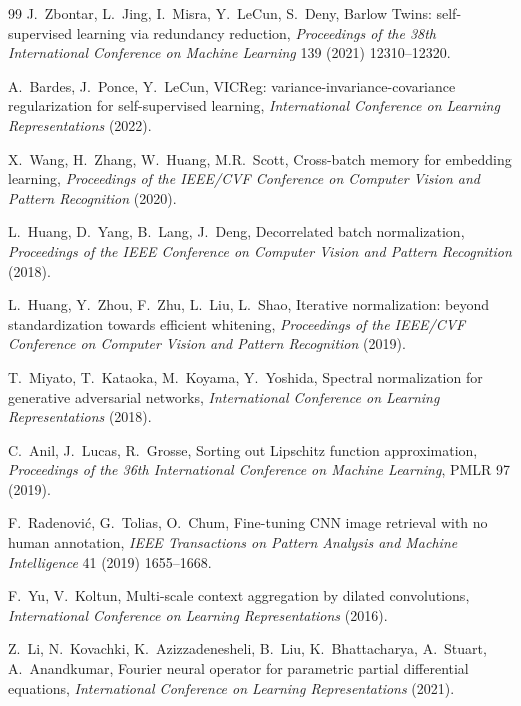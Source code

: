 \documentclass[preprint,11pt,a4paper]{elsarticle}
\begin{document}
\begin{thebibliography}{99}
J.~Zbontar, L.~Jing, I.~Misra, Y.~LeCun, S.~Deny,
\newblock Barlow Twins: self-supervised learning via redundancy reduction,
\newblock \emph{Proceedings of the 38th International Conference on Machine Learning}
139 (2021) 12310--12320.

A.~Bardes, J.~Ponce, Y.~LeCun,
\newblock VICReg: variance-invariance-covariance regularization for
self-supervised learning,
\newblock \emph{International Conference on Learning Representations} (2022).

X.~Wang, H.~Zhang, W.~Huang, M.R.~Scott,
\newblock Cross-batch memory for embedding learning,
\newblock \emph{Proceedings of the IEEE/CVF Conference on Computer Vision and Pattern
Recognition} (2020).

L.~Huang, D.~Yang, B.~Lang, J.~Deng,
\newblock Decorrelated batch normalization,
\newblock \emph{Proceedings of the IEEE Conference on Computer Vision and Pattern
Recognition} (2018).

L.~Huang, Y.~Zhou, F.~Zhu, L.~Liu, L.~Shao,
\newblock Iterative normalization: beyond standardization towards efficient whitening,
\newblock \emph{Proceedings of the IEEE/CVF Conference on Computer Vision and Pattern
Recognition} (2019).

T.~Miyato, T.~Kataoka, M.~Koyama, Y.~Yoshida,
\newblock Spectral normalization for generative adversarial networks,
\newblock \emph{International Conference on Learning Representations} (2018).

C.~Anil, J.~Lucas, R.~Grosse,
\newblock Sorting out Lipschitz function approximation,
\newblock \emph{Proceedings of the 36th International Conference on Machine Learning},
PMLR 97 (2019).

F.~Radenovi\'c, G.~Tolias, O.~Chum,
\newblock Fine-tuning CNN image retrieval with no human annotation,
\newblock \emph{IEEE Transactions on Pattern Analysis and Machine Intelligence}
41 (2019) 1655--1668.

F.~Yu, V.~Koltun,
\newblock Multi-scale context aggregation by dilated convolutions,
\newblock \emph{International Conference on Learning Representations} (2016).

Z.~Li, N.~Kovachki, K.~Azizzadenesheli, B.~Liu, K.~Bhattacharya, A.~Stuart,
A.~Anandkumar,
\newblock Fourier neural operator for parametric partial differential equations,
\newblock \emph{International Conference on Learning Representations} (2021).


\end{thebibliography}
\end{document}
